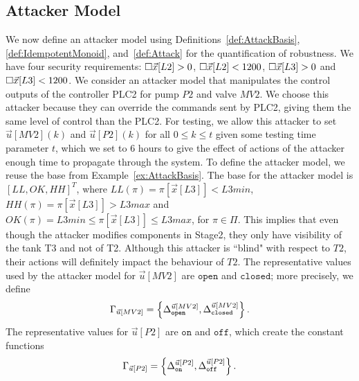 {\subsection{Attacker Model}%
We now define an attacker model using Definitions~\ref{def:AttackBasis}, \ref{def:IdempotentMonoid}, and~\ref{def:Attack} for the quantification of robustness. We have four security requirements: ${{\square}}{\vec{x}[L2]>0}$, ${{\square}}{\vec{x}[L2]<1200}$, ${{\square}}{\vec{x}[L3]>0}$ and ${{\square}}{\vec{x}[L3]<1200}$. 
We consider an attacker model that manipulates the control outputs of the controller PLC2 for pump $P2$ and valve $MV2$. We choose this attacker because they can override the commands sent by PLC2, giving them the same level of control than the PLC2. For testing, we allow this attacker to set $\vec{u}[MV2](k)$ and $\vec{u}[P2](k)$ for all $0\leq k\leq t$ given some testing time parameter $t$, which we set to 6 hours to give the effect of actions of the attacker enough time to propagate through the system. To define the attacker model, we reuse the base from Example~\ref{ex:AttackBasis}. The base for the attacker model is $[LL, OK, HH]^T$, where ${LL}(\pi)=\pi[\vec{x}[L3]]<L3min$, ${HH}(\pi)=\pi[\vec{x}[L3]]>L3max$ and ${OK}(\pi)=L3min \leq \pi[\vec{x}[L3]]\leq L3max$, for $\pi \in \Pi$. This implies that even though the attacker modifies components in Stage2, they only have visibility of the tank T3 and not of T2. Although this attacker is ``blind" with respect to $T2$, their actions will definitely impact the behaviour of $T2$. The representative values used by the attacker model for $\vec{u}[MV2]$ are $\texttt{open}$ and $\texttt{closed}$; more precisely, we define
\begin{align*}
  \Gamma_{\vec{u}[MV2]}=\left\{{\Delta}^{\vec{u}[MV2]}_{\texttt{open}}, {\Delta}^{\vec{u}[MV2]}_{\texttt{closed}}\right\}.
\end{align*}
The representative values for $\vec{u}[P2]$ are $\texttt{on}$ and $\texttt{off}$, which create the constant functions
\begin{align*}
  \Gamma_{\vec{u}[P2]}=\left\{{\Delta}^{\vec{u}[P2]}_{\texttt{on}}, {\Delta}^{\vec{u}[P2]}_{\texttt{off}}\right\}.
\end{align*}
}
